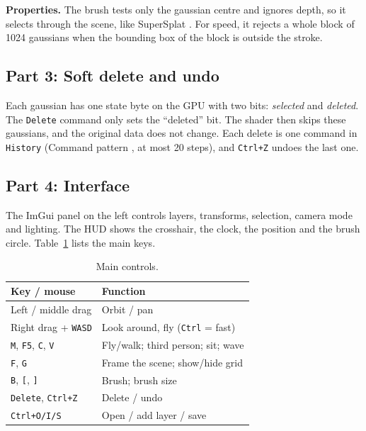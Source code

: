 \documentclass[9pt,twocolumn,a4paper]{extarticle}
\newcommand{\code}[1]{\texttt{#1}}
\begin{document}
\textbf{Properties.} The brush tests only the gaussian centre and ignores depth, so it selects through the scene, like SuperSplat \cite{supersplat}. For speed, it rejects a whole block of 1024 gaussians when the bounding box of the block is outside the stroke.

\subsection{Part 3: Soft delete and undo}
Each gaussian has one state byte on the GPU with two bits: \emph{selected} and \emph{deleted}. The \code{Delete} command only sets the ``deleted'' bit. The shader then skips these gaussians, and the original data does not change. Each delete is one command in \code{History} (Command pattern \cite{gamma1994design}, at most 20 steps), and \code{Ctrl+Z} undoes the last one.

\par\noindent{}\par\vspace{3pt}

\subsection{Part 4: Interface}
The ImGui panel on the left controls layers, transforms, selection, camera mode and lighting. The HUD shows the crosshair, the clock, the position and the brush circle. Table~\ref{tab:keys} lists the main keys.
\begin{table}[H]
\centering
\caption{Main controls.}
\label{tab:keys}
\footnotesize
\begin{tabular}{@{}p{3.1cm}p{4.6cm}@{}}
\toprule
Key / mouse & Function \\
\midrule
Left / middle drag & Orbit / pan \\
Right drag + \code{WASD} & Look around, fly (\code{Ctrl} = fast) \\
\code{M}, \code{F5}, \code{C}, \code{V} & Fly/walk; third person; sit; wave \\
\code{F}, \code{G} & Frame the scene; show/hide grid \\
\code{B}, \code{[}, \code{]} & Brush; brush size \\
\code{Delete}, \code{Ctrl+Z} & Delete / undo \\
\code{Ctrl+O/I/S} & Open / add layer / save \\
\bottomrule
\end{tabular}
\end{table}
\end{document}
